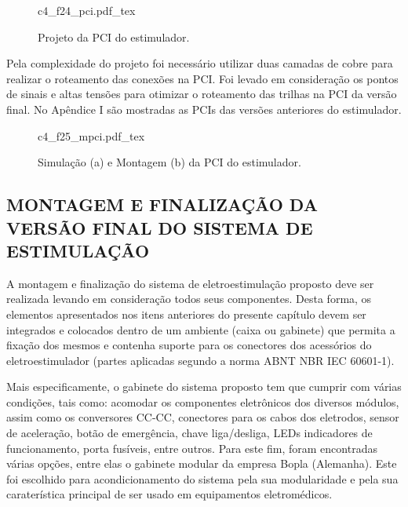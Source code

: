 \begin{figure}
    \centering %
    \small %
    \def\svgwidth{0.7\columnwidth}%
    {c4_f24_pci.pdf_tex}
    \caption{Projeto da \acrshort{PCI} do estimulador.}
    \label{fig:c4_f24_pci}
\end{figure}

Pela complexidade do projeto foi necessário utilizar duas camadas de cobre para realizar o roteamento das conexões na \acrshort{PCI}. Foi levado em consideração os pontos de sinais e altas tensões para otimizar o roteamento das trilhas na \acrshort{PCI} da versão final. No Apêndice I são mostradas as \acrshort{PCI}s das versões anteriores do estimulador.

\begin{figure}
    \centering %
    \small %
    \def\svgwidth{1\columnwidth}%
    {c4_f25_mpci.pdf_tex}
    \caption{Simulação (a) e Montagem (b) da \acrshort{PCI} do estimulador.}
    \label{fig:c4_f25_mpci}
\end{figure}


\subsection{MONTAGEM E FINALIZAÇÃO DA VERSÃO FINAL DO SISTEMA DE ESTIMULAÇÃO}  
A montagem e finalização do sistema de eletroestimulação proposto deve ser realizada levando em consideração todos seus componentes. Desta forma, os elementos apresentados nos itens anteriores do presente capítulo devem ser integrados e colocados dentro de um ambiente (caixa ou gabinete) que permita a fixação dos mesmos e contenha suporte para os conectores dos acessórios do eletroestimulador (partes aplicadas segundo a norma \acrshort{ABNT} \acrshort{NBR} \acrshort{IEC} 60601-1). 

Mais especificamente, o gabinete do sistema proposto tem que cumprir com várias condições, tais como: acomodar os componentes eletrônicos dos diversos módulos, assim como os conversores CC-CC, conectores para os cabos dos eletrodos, sensor de aceleração, botão de emergência, chave liga/desliga, \acrshort{LED}s indicadores de funcionamento, porta fusíveis, entre outros. Para este fim, foram encontradas várias opções, entre elas o gabinete modular da empresa Bopla (Alemanha). Este foi escolhido para acondicionamento do sistema pela sua modularidade e pela sua caraterística principal de ser usado em equipamentos eletromédicos.

